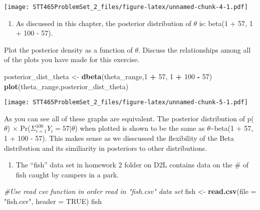 \documentclass[]{article}
\newenvironment{Shaded}{\begin{snugshade}}{\end{snugshade}}
\newcommand{\KeywordTok}[1]{\textcolor[rgb]{0.13,0.29,0.53}{\textbf{#1}}}
\newcommand{\DataTypeTok}[1]{\textcolor[rgb]{0.13,0.29,0.53}{#1}}
\newcommand{\DecValTok}[1]{\textcolor[rgb]{0.00,0.00,0.81}{#1}}
\newcommand{\StringTok}[1]{\textcolor[rgb]{0.31,0.60,0.02}{#1}}
\newcommand{\CommentTok}[1]{\textcolor[rgb]{0.56,0.35,0.01}{\textit{#1}}}
\newcommand{\OtherTok}[1]{\textcolor[rgb]{0.56,0.35,0.01}{#1}}
\newcommand{\OperatorTok}[1]{\textcolor[rgb]{0.81,0.36,0.00}{\textbf{#1}}}
\newcommand{\NormalTok}[1]{#1}
\providecommand{\tightlist}{%
  \setlength{\itemsep}{0pt}\setlength{\parskip}{0pt}}
\begin{document}
\texttt{[image: STT465ProblemSet\_2\_files/figure-latex/unnamed-chunk-4-1.pdf]}

\begin{enumerate}
\def\labelenumi{\alph{enumi})}
\setcounter{enumi}{4}
\tightlist
\item
  As discussed in this chapter, the posterior distribution of \(\theta\)
  is: beta(1 + 57, 1 + 100 - 57).
\end{enumerate}

Plot the posterior density as a function of \(\theta\). Discuss the
relationships among all of the plots you have made for this exercise.

\begin{Shaded}
\begin{Highlighting}[]
\NormalTok{posterior_dist_theta <-}\StringTok{ }\KeywordTok{dbeta}\NormalTok{(theta_range,}\DecValTok{1} \OperatorTok{+}\StringTok{ }\DecValTok{57}\NormalTok{, }\DecValTok{1} \OperatorTok{+}\StringTok{ }\DecValTok{100} \OperatorTok{-}\StringTok{ }\DecValTok{57}\NormalTok{)}
\KeywordTok{plot}\NormalTok{(theta_range,posterior_dist_theta)}
\end{Highlighting}
\end{Shaded}

\texttt{[image: STT465ProblemSet\_2\_files/figure-latex/unnamed-chunk-5-1.pdf]}

As you can see all of these graphs are equivalent. The posterior
distribution of p(\(\theta\)) ×
Pr(\(\Sigma_{i=1}^{100} Y_i = 57|\theta\)) when plotted is shown to be
the same as \(\theta\)\textasciitilde{}beta(1 + 57, 1 + 100 - 57). This
makes sense as we disscussed the flexibility of the Beta distribution
and its similiarity in posteriors to other distributions.

\begin{enumerate}
\def\labelenumi{\arabic{enumi}.}
\setcounter{enumi}{1}
\tightlist
\item
  The ``fish'' data set in homework 2 folder on D2L contains data on the
  \# of fish caught by campers in a park.
\end{enumerate}

\begin{Shaded}
\begin{Highlighting}[]
\CommentTok{#Use read csv function in order read in "fish.csv" data set }
\NormalTok{fish <-}\StringTok{ }\KeywordTok{read.csv}\NormalTok{(}\DataTypeTok{file =} \StringTok{"fish.csv"}\NormalTok{, }\DataTypeTok{header =} \OtherTok{TRUE}\NormalTok{)}
\NormalTok{fish}
\end{Highlighting}
\end{Shaded}
\end{document}
